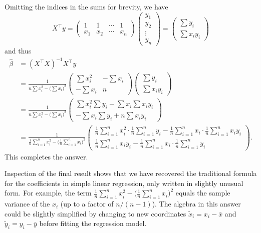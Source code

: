 \documentclass[
  a4paper,
]{article}
\theoremstyle{definition}
\theoremstyle{definition}
\theoremstyle{definition}
\theoremstyle{definition}
\theoremstyle{remark}
\begin{document}
\begin{myanswers}
Omitting the indices in the sums for brevity, we have
\begin{equation*}
    X^\top y
    = \begin{pmatrix}
        1 & 1 & \cdots & 1 \\
        x_1 & x_2 & \cdots & x_n
    \end{pmatrix} \begin{pmatrix}
      y_1 \\ y_2 \\ \vdots \\ y_n
    \end{pmatrix}
    = \begin{pmatrix}
      \sum y_i \\
      \sum x_i y_i
    \end{pmatrix}
  \end{equation*}
and thus
\begin{align*}
    \hat\beta
    &= (X^\top X)^{-1} X^\top y \\
    &= \frac{1}{n \sum x_i^2 - \bigl(\sum x_i\bigr)^2}
      \begin{pmatrix}
      \sum x_i^2 & -\sum x_i \\
      -\sum x_i & n
    \end{pmatrix}
    \begin{pmatrix}
      \sum y_i \\
      \sum x_i y_i
    \end{pmatrix} \\
    &= \frac{1}{n \sum x_i^2 - \bigl(\sum x_i\bigr)^2}
      \begin{pmatrix}
        \sum x_i^2 \sum y_i - \sum x_i \sum x_i y_i \\
        -\sum x_i \sum y_i + n \sum x_i y_i
      \end{pmatrix} \\
    &= \frac{1}{\frac1n \sum_{i=1}^n x_i^2 - \bigl(\frac1n \sum_{i=1}^n x_i\bigr)^2}
      \begin{pmatrix}
        \frac1n \sum_{i=1}^n x_i^2 \cdot \frac1n\sum_{i=1}^n y_i
            - \frac1n\sum_{i=1}^n x_i \cdot \frac1n\sum_{i=1}^n x_i y_i \\
        \frac1n\sum_{i=1}^n x_i y_i
            - \frac1n\sum_{i=1}^n x_i \cdot \frac1n\sum_{i=1}^n y_i
      \end{pmatrix}.
  \end{align*}
This completes the answer.

Inspection of the final result shows that we have recovered the traditional
formula for the coefficients in simple linear regression, only written in
slightly unusual form. For example, the term \(\frac1n \sum_{i=1}^n x_i^2 -  \bigl(\frac1n \sum_{i=1}^n x_i\bigr)^2\) equals the sample variance of the
\(x_i\) (up to a factor of \(n/(n-1)\)). The algebra in this answer could be
slightly simplified by changing to new coordinates \(\tilde x_i = x_i - \bar  x\) and \(\tilde y_i = y_i - \bar y\) before fitting the regression model.

\end{myanswers}
\end{document}
